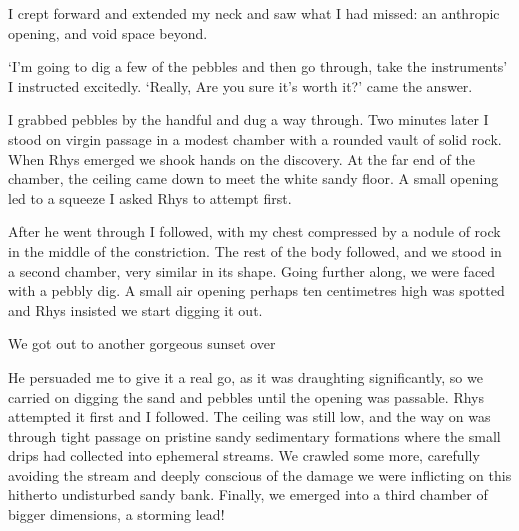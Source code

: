 I crept forward and extended my neck and saw what I had missed: an anthropic opening, and void space beyond. 

`I'm going to dig a few of the pebbles and then go through, take the instruments' I instructed excitedly. `Really, Are you sure it's worth it?' came the answer. 

I grabbed pebbles by the handful and dug a way through. Two minutes later I stood on virgin passage in a modest chamber with a rounded vault of solid rock. When Rhys emerged we shook hands on the discovery. At the far end of the chamber, the ceiling came down to meet the white sandy floor. A small opening led to a squeeze I asked Rhys to attempt first. 

After he went through I followed, with my chest compressed by a nodule of rock in the middle of the constriction. The rest of the body followed, and we stood in a second chamber, very similar in its shape. Going further along, we were faced with a pebbly dig. A small air opening perhaps ten centimetres high was spotted and Rhys insisted we start digging it out.
\begin{pagefigure}
	\checkoddpage \ifoddpage \forcerectofloat \else \forceversofloat \fi
	\centering
{}
\caption{We got out to another gorgeous sunset over \protect{} } \label{fig:krn_sunset}
\end{pagefigure}

He persuaded me to give it a real go, as it was draughting significantly, so we carried on digging the sand and pebbles until the opening was passable. Rhys attempted it first and I followed. The ceiling was still low, and the way on was through tight passage on pristine sandy sedimentary formations where the small drips had collected into ephemeral streams. We crawled some more, carefully avoiding the stream and deeply conscious of the damage we were inflicting on this hitherto undisturbed sandy bank. Finally, we emerged into a third chamber of bigger dimensions, a storming lead! 


